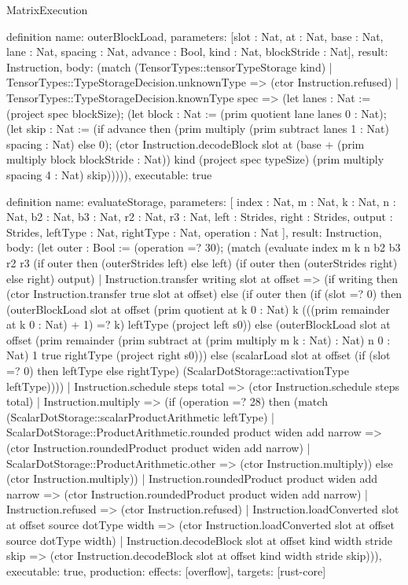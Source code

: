 \begin{lexlean}{MatrixExecution}
\begin{semanticmodule}
definition{
  name: outerBlockLoad,
  parameters: [slot : Nat, at : Nat, base : Nat, lane : Nat, spacing : Nat, advance : Bool, kind : Nat, blockStride : Nat],
  result: Instruction,
  body: (match (TensorTypes::tensorTypeStorage kind)
    | TensorTypes::TypeStorageDecision.unknownType => (ctor Instruction.refused)
    | TensorTypes::TypeStorageDecision.knownType spec => (let lanes : Nat := (project spec blockSize);
      (let block : Nat := (prim quotient lane lanes 0 : Nat);
      (let skip : Nat := (if advance then (prim multiply (prim subtract lanes 1 : Nat) spacing : Nat) else 0);
        (ctor Instruction.decodeBlock slot at (base + (prim multiply block blockStride : Nat)) kind (project spec typeSize) (prim multiply spacing 4 : Nat) skip))))),
  executable: true
}

definition{
  name: evaluateStorage,
  parameters: [
    index : Nat,
    m : Nat,
    k : Nat,
    n : Nat,
    b2 : Nat,
    b3 : Nat,
    r2 : Nat,
    r3 : Nat,
    left : Strides,
    right : Strides,
    output : Strides,
    leftType : Nat,
    rightType : Nat,
    operation : Nat
  ],
  result: Instruction,
  body: (let outer : Bool := (operation =? 30);
    (match (evaluate index m k n b2 b3 r2 r3 (if outer then (outerStrides left) else left) (if outer then (outerStrides right) else right) output)
    | Instruction.transfer writing slot at offset => (if writing then (ctor Instruction.transfer true slot at offset)
      else (if outer then (if (slot =? 0)
        then (outerBlockLoad slot at offset (prim quotient at k 0 : Nat) k (((prim remainder at k 0 : Nat) + 1) =? k) leftType (project left s0))
        else (outerBlockLoad slot at offset (prim remainder (prim subtract at (prim multiply m k : Nat) : Nat) n 0 : Nat) 1 true rightType (project right s0)))
      else (scalarLoad slot at offset (if (slot =? 0) then leftType else rightType) (ScalarDotStorage::activationType leftType))))
    | Instruction.schedule steps total => (ctor Instruction.schedule steps total)
    | Instruction.multiply => (if (operation =? 28) then (match (ScalarDotStorage::scalarProductArithmetic leftType)
      | ScalarDotStorage::ProductArithmetic.rounded product widen add narrow => (ctor Instruction.roundedProduct product widen add narrow)
      | ScalarDotStorage::ProductArithmetic.other => (ctor Instruction.multiply)) else (ctor Instruction.multiply))
    | Instruction.roundedProduct product widen add narrow => (ctor Instruction.roundedProduct product widen add narrow)
    | Instruction.refused => (ctor Instruction.refused)
    | Instruction.loadConverted slot at offset source dotType width => (ctor Instruction.loadConverted slot at offset source dotType width)
    | Instruction.decodeBlock slot at offset kind width stride skip => (ctor Instruction.decodeBlock slot at offset kind width stride skip))),
  executable: true,
  production: {effects: [overflow], targets: [rust-core]}
}


\end{semanticmodule}
\end{lexlean}
